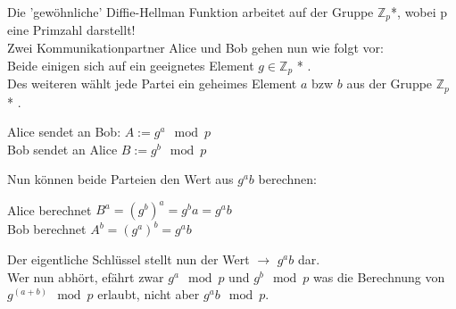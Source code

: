 \documentclass[a4paper,12pt]{scrartcl}
\begin{document}
Die 'gewöhnliche' Diffie-Hellman Funktion arbeitet auf der Gruppe $\mathbb{Z}_{p}$*, wobei p eine Primzahl darstellt!\\
Zwei Kommunikationpartner Alice und Bob gehen nun wie folgt vor:\\
Beide einigen sich auf ein geeignetes Element $g \in \mathbb{Z}_{p}$ * .\\
Des weiteren wählt jede Partei ein geheimes Element $a$ bzw $b$ aus der Gruppe $\mathbb{Z}_{p}$ * .\\
\begin{center}
 Alice sendet an Bob: $A := g^a \mod p$\\
 Bob sendet an Alice $B := g^b \mod p$
\end{center}
Nun können beide Parteien den Wert aus $g^ab$ berechnen:
\begin{center}
 Alice berechnet $B^a = (g^b)^a = g^ba = g^ab$\\
 Bob berechnet $A^b = (g^a)^b = g^ab$
\end{center}
Der eigentliche Schlüssel stellt nun der Wert $\rightarrow$ $g^ab$ dar.\\
Wer nun abhört, efährt zwar $g^a \mod p$ und $g^b \mod p$ was die Berechnung von $g^(a+b) \mod p$ erlaubt, nicht aber $g^ab \mod p$.
\end{document}
